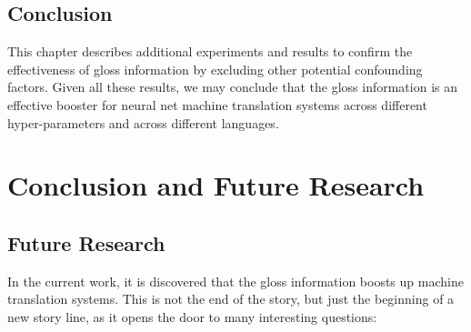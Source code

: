 \documentclass[final]{ua-thesis}
\numberwithin{equation}{section}
\begin{document}
\section{Conclusion}

This chapter describes additional experiments and results to confirm the effectiveness of gloss information by excluding other potential confounding factors.
Given all these results, we may conclude that the gloss information is an effective booster for neural net machine translation systems across different hyper-parameters and across different languages.       
\chapter{Conclusion and Future Research}

\section{Future Research}

In the current work, it is discovered that the gloss information boosts up machine translation systems. This is not the end of the story, but just the beginning of a new story line, as it opens the door to many interesting questions:
\end{document}
